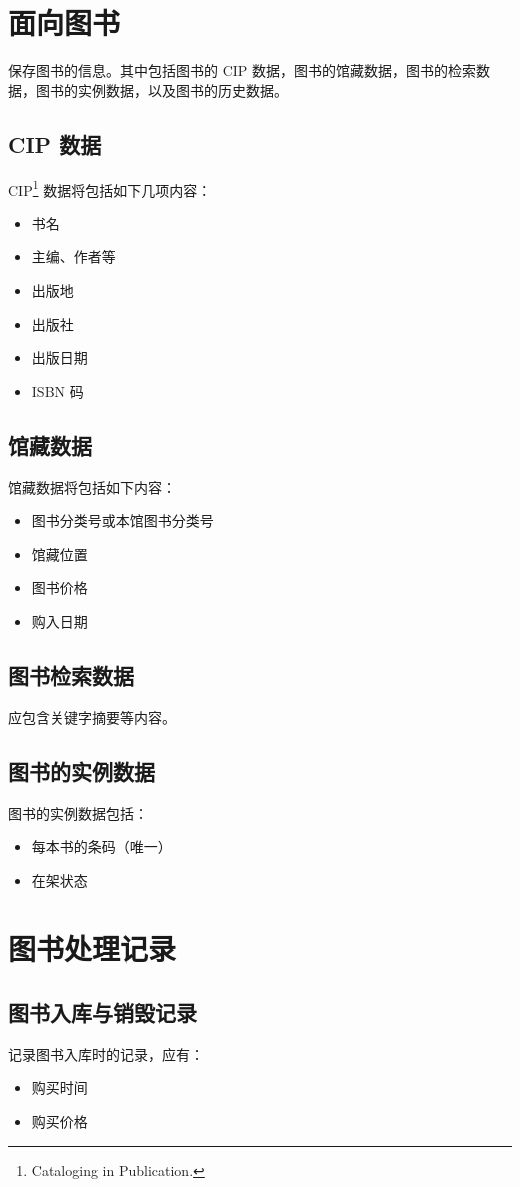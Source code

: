 \documentclass[UTF8]{report}
\begin{document}
    \section{面向图书}
    保存图书的信息。其中包括图书的 CIP 数据，图书的馆藏数据，图书的检索数据，图书的实例数据，以及图书的历史数据。
    \subsection{CIP 数据}
    CIP\footnote{Cataloging in Publication.}  数据将包括如下几项内容：
    \begin{itemize}
    	\item 书名
    	\item 主编、作者等
    	\item 出版地
    	\item 出版社
    	\item 出版日期
    	\item ISBN 码
    \end{itemize}
    \subsection{馆藏数据}
    馆藏数据将包括如下内容：
    \begin{itemize}
    	\item 图书分类号或本馆图书分类号
    	\item 馆藏位置
    	\item 图书价格
    	\item 购入日期
    \end{itemize}
    \subsection{图书检索数据}
    应包含关键字摘要等内容。
    \subsection{图书的实例数据}
    图书的实例数据包括：
    \begin{itemize}
    	\item 每本书的条码（唯一）
    	\item 在架状态
    \end{itemize}
    \section{图书处理记录}
    \subsection{图书入库与销毁记录}
    记录图书入库时的记录，应有：
    \begin{itemize}
        \item 购买时间
        \item 购买价格
    \end{itemize}
\end{document}
